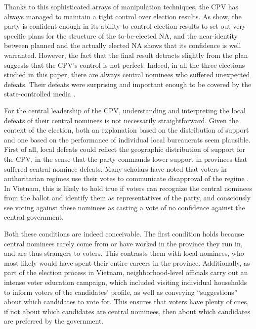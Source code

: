 \documentclass[12pt]{article}\usepackage[]{graphicx}\usepackage[]{color}
\newcommand{\1}{\mathbbm{1}}
\begin{document}
Thanks to this sophisticated arrays of manipulation techniques, the CPV has always managed to maintain a tight control over election results. As \cite{MaleskySchuler2011} show, the party is confident enough in its ability to control election results to set out very specific plans for the structure of the to-be-elected NA, and the near-identity between planned and the actually elected NA shows that its confidence is well warranted. However, the fact that the final result detracts slightly from the plan suggests that the CPV's control is not perfect. Indeed, in all the three elections studied in this paper, there are always central nominees who suffered unexpected defeats. Their defeats were surprising and important enough to be covered by the state-controlled media \citep{somemedia}.

For the central leadership of the CPV, understanding and interpreting the local defeats of their central nominees is not necessarily straightforward. Given the context of the election, both an explanation based on the distribution of support and one based on the performance of individual local bureaucrats seem plausible. First of all, local defeats could reflect the geographic distribution of support for the CPV, in the sense that the party commands lower support in provinces that suffered central nominee defeats. Many scholars have noted that voters in authoritarian regimes use their votes to communicate disapproval of the regime \citep{someone, whoever}. In Vietnam, this is likely to hold true if voters can recognize the central nominees from the ballot and identify them as representatives of the party, and consciously see voting against these nominees as casting a vote of no confidence against the central government. 

Both these conditions are indeed conceivable. The first condition holds because central nominees rarely come from or have worked in the province they run in, and are thus strangers to voters. This contrasts them with local nominees, who most likely would have spent their entire careers in the province. Additionally, as part of the election process in Vietnam, neighborhood-level officials carry out an intense voter education campaign, which included visiting individual households to inform voters of the candidates' profile, as well as conveying ``suggestions'' about which candidates to vote for. This ensures that voters have plenty of cues, if not about which candidates are central nominees, then about which candidates are preferred by the government. 
\end{document}
